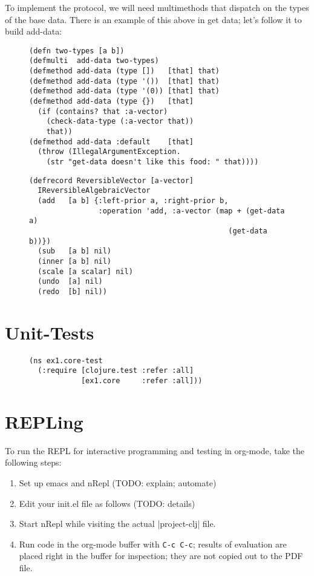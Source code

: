 \documentclass[11pt]{article}
\begin{document}
To implement the protocol, we will need multimethods that dispatch on
the types of the base data. There is an example of this above in get
data; let's follow it to build add-data:

\begin{figure}[H]
\label{add-data}
\begin{verbatim}
(defn two-types [a b])
(defmulti  add-data two-types)
(defmethod add-data (type [])   [that] that)
(defmethod add-data (type '())  [that] that)
(defmethod add-data (type '(0)) [that] that)
(defmethod add-data (type {})   [that]
  (if (contains? that :a-vector)
    (check-data-type (:a-vector that))
    that))
(defmethod add-data :default    [that]
  (throw (IllegalArgumentException.
    (str "get-data doesn't like this food: " that))))
\end{verbatim}
\end{figure}


\begin{figure}[H]
\label{reversible-algebraic-vector-on-vector}
\begin{verbatim}
(defrecord ReversibleVector [a-vector]
  IReversibleAlgebraicVector
  (add   [a b] {:left-prior a, :right-prior b,
                :operation 'add, :a-vector (map + (get-data a)
                                              (get-data b))})
  (sub   [a b] nil)
  (inner [a b] nil)
  (scale [a scalar] nil)
  (undo  [a] nil)
  (redo  [b] nil))
\end{verbatim}
\end{figure}
\section{Unit-Tests}
\label{sec-4}

\begin{figure}[H]
\label{test-namespace}
\begin{verbatim}
(ns ex1.core-test
  (:require [clojure.test :refer :all]
            [ex1.core     :refer :all]))
\end{verbatim}
\end{figure}
\section{REPLing}
\label{sec-5}
\label{sec:emacs-repl}
To run the REPL for interactive programming and testing in org-mode,
take the following steps:
\begin{enumerate}
\item Set up emacs and nRepl (TODO: explain; automate)
\item Edit your init.el file as follows (TODO: details)
\item Start nRepl while visiting the actual |project-clj| file.
\item Run code in the org-mode buffer with \verb|C-c C-c|; results of
evaluation are placed right in the buffer for inspection; they are
not copied out to the PDF file.
\end{enumerate}
\end{document}
